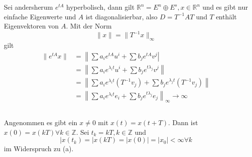 \documentclass[a4paper]{article}
\begin{document}
Sei andersherum $e^{tA}$ hyperbolisch, dann gilt $ℝ^n = E^n \oplus E^s, x\in ℝ^n$ und es gibt nur einfache Eigenwerte und $A$ ist diagonalisierbar, also $D = T^{-1} A T$ und $T$ enthält Eigenvektoren von $A$. Mit der Norm
$$\| x\| = \|T^{-1} x\|_\infty$$ gilt
\begin{align*}
\|e^{tA} x \| &= \left\|\sum a_i e^{tA}u^i + \sum b_j e^{tA} v^j \right|\\
&=\left\| \sum a_i e^{λ_i t} u^i + \sum b_j e^{tλ_j} v^j \right\| \\
&= \left\| \sum a_i e^{λ_i t} (T^{-1}v_j ) + \sum b_j e^{λ_j t} (T^{-1} v_j) \right\| \\
&= \left\| \sum a_i e^{λ_it} e_i + \sum b_j e^{tλ_j} e_j \right\|_\infty \to \infty
\end{align*}

\subsection{}
Angenommen es gibt ein $x\ne 0$ mit $x(t) = x(t+T)$. Dann ist $x(0) = x(kT)∀k\in ℤ$. Sei $t_k = kT, k\in ℤ$ und
$$|x(t_k) = |x(kT) = |x(0)| = |x_0| < ∞ ∀k$$ 
im Widerspruch zu (a).
\end{document}
